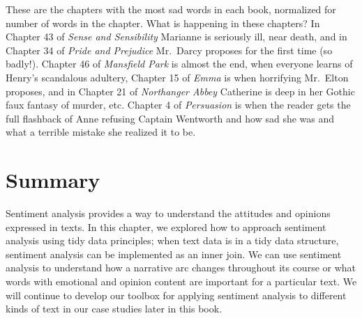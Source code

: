 \documentclass[
]{book}
\begin{document}
These are the chapters with the most sad words in each book, normalized for number of words in the chapter. What is happening in these chapters? In Chapter 43 of \emph{Sense and Sensibility} Marianne is seriously ill, near death, and in Chapter 34 of \emph{Pride and Prejudice} Mr.~Darcy proposes for the first time (so badly!). Chapter 46 of \emph{Mansfield Park} is almost the end, when everyone learns of Henry's scandalous adultery, Chapter 15 of \emph{Emma} is when horrifying Mr.~Elton proposes, and in Chapter 21 of \emph{Northanger Abbey} Catherine is deep in her Gothic faux fantasy of murder, etc. Chapter 4 of \emph{Persuasion} is when the reader gets the full flashback of Anne refusing Captain Wentworth and how sad she was and what a terrible mistake she realized it to be.

\section{Summary}\label{summary-1}

Sentiment analysis provides a way to understand the attitudes and opinions expressed in texts. In this chapter, we explored how to approach sentiment analysis using tidy data principles; when text data is in a tidy data structure, sentiment analysis can be implemented as an inner join. We can use sentiment analysis to understand how a narrative arc changes throughout its course or what words with emotional and opinion content are important for a particular text. We will continue to develop our toolbox for applying sentiment analysis to different kinds of text in our case studies later in this book.

  
\end{document}
